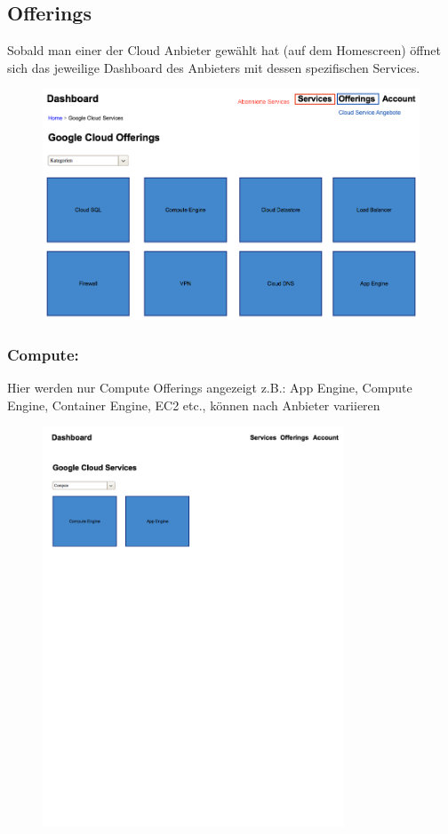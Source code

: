 \subsection{Offerings}
Sobald man einer der Cloud Anbieter gewählt hat (auf dem Homescreen) öffnet 
sich das jeweilige Dashboard des Anbieters mit dessen spezifischen Services.
\begin{figure}[h]
  \includegraphics[width=\textwidth]{./03_Analyse/03_Dashboard/images/homescreen_google}
\end{figure}

\newpage
\subsubsection{Compute:}

Hier werden nur Compute Offerings angezeigt z.B.: App Engine, Compute Engine, 
Container Engine, EC2 etc., können nach Anbieter variieren
\begin{figure}[h]
   \includegraphics[width=0.8\textwidth]{./03_Analyse/03_Dashboard/images/homescreen_google_compute}
\end{figure}
 



